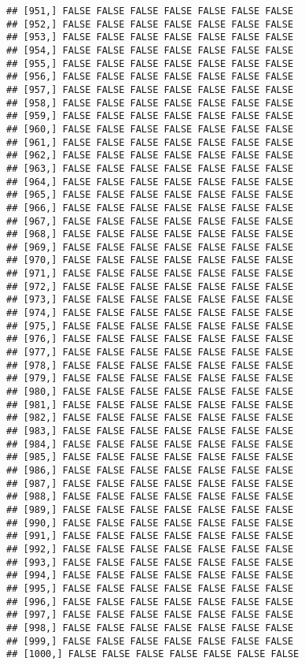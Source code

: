 \documentclass[
]{article}
\begin{document}
\begin{verbatim}
## [951,] FALSE FALSE FALSE FALSE FALSE FALSE FALSE
## [952,] FALSE FALSE FALSE FALSE FALSE FALSE FALSE
## [953,] FALSE FALSE FALSE FALSE FALSE FALSE FALSE
## [954,] FALSE FALSE FALSE FALSE FALSE FALSE FALSE
## [955,] FALSE FALSE FALSE FALSE FALSE FALSE FALSE
## [956,] FALSE FALSE FALSE FALSE FALSE FALSE FALSE
## [957,] FALSE FALSE FALSE FALSE FALSE FALSE FALSE
## [958,] FALSE FALSE FALSE FALSE FALSE FALSE FALSE
## [959,] FALSE FALSE FALSE FALSE FALSE FALSE FALSE
## [960,] FALSE FALSE FALSE FALSE FALSE FALSE FALSE
## [961,] FALSE FALSE FALSE FALSE FALSE FALSE FALSE
## [962,] FALSE FALSE FALSE FALSE FALSE FALSE FALSE
## [963,] FALSE FALSE FALSE FALSE FALSE FALSE FALSE
## [964,] FALSE FALSE FALSE FALSE FALSE FALSE FALSE
## [965,] FALSE FALSE FALSE FALSE FALSE FALSE FALSE
## [966,] FALSE FALSE FALSE FALSE FALSE FALSE FALSE
## [967,] FALSE FALSE FALSE FALSE FALSE FALSE FALSE
## [968,] FALSE FALSE FALSE FALSE FALSE FALSE FALSE
## [969,] FALSE FALSE FALSE FALSE FALSE FALSE FALSE
## [970,] FALSE FALSE FALSE FALSE FALSE FALSE FALSE
## [971,] FALSE FALSE FALSE FALSE FALSE FALSE FALSE
## [972,] FALSE FALSE FALSE FALSE FALSE FALSE FALSE
## [973,] FALSE FALSE FALSE FALSE FALSE FALSE FALSE
## [974,] FALSE FALSE FALSE FALSE FALSE FALSE FALSE
## [975,] FALSE FALSE FALSE FALSE FALSE FALSE FALSE
## [976,] FALSE FALSE FALSE FALSE FALSE FALSE FALSE
## [977,] FALSE FALSE FALSE FALSE FALSE FALSE FALSE
## [978,] FALSE FALSE FALSE FALSE FALSE FALSE FALSE
## [979,] FALSE FALSE FALSE FALSE FALSE FALSE FALSE
## [980,] FALSE FALSE FALSE FALSE FALSE FALSE FALSE
## [981,] FALSE FALSE FALSE FALSE FALSE FALSE FALSE
## [982,] FALSE FALSE FALSE FALSE FALSE FALSE FALSE
## [983,] FALSE FALSE FALSE FALSE FALSE FALSE FALSE
## [984,] FALSE FALSE FALSE FALSE FALSE FALSE FALSE
## [985,] FALSE FALSE FALSE FALSE FALSE FALSE FALSE
## [986,] FALSE FALSE FALSE FALSE FALSE FALSE FALSE
## [987,] FALSE FALSE FALSE FALSE FALSE FALSE FALSE
## [988,] FALSE FALSE FALSE FALSE FALSE FALSE FALSE
## [989,] FALSE FALSE FALSE FALSE FALSE FALSE FALSE
## [990,] FALSE FALSE FALSE FALSE FALSE FALSE FALSE
## [991,] FALSE FALSE FALSE FALSE FALSE FALSE FALSE
## [992,] FALSE FALSE FALSE FALSE FALSE FALSE FALSE
## [993,] FALSE FALSE FALSE FALSE FALSE FALSE FALSE
## [994,] FALSE FALSE FALSE FALSE FALSE FALSE FALSE
## [995,] FALSE FALSE FALSE FALSE FALSE FALSE FALSE
## [996,] FALSE FALSE FALSE FALSE FALSE FALSE FALSE
## [997,] FALSE FALSE FALSE FALSE FALSE FALSE FALSE
## [998,] FALSE FALSE FALSE FALSE FALSE FALSE FALSE
## [999,] FALSE FALSE FALSE FALSE FALSE FALSE FALSE
## [1000,] FALSE FALSE FALSE FALSE FALSE FALSE FALSE

\end{verbatim}
\end{document}
